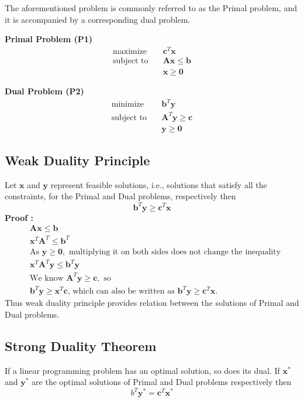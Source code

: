 \documentclass[twoside]{article}
\begin{document}
The aforementioned problem is commonly referred to as the Primal problem, and it is accompanied by a corresponding dual problem.\\

\begin{minipage}[t]{0.45\textwidth}
  \centering
  \textbf{Primal Problem (P1)}
  \begin{align*}
    \text{maximize} \quad & \mathbf{c}^T \mathbf{x} \\
    \text{subject to} \quad & \mathbf{Ax} \leq \mathbf{b} \\
    & \mathbf{x} \geq \mathbf{0}
  \end{align*}
\end{minipage}
\hfill
\begin{minipage}[t]{0.45\textwidth}
  \centering
  \textbf{Dual Problem (P2)}
  \begin{align*}
    \text{minimize} \quad & \mathbf{b}^T \mathbf{y} \\
    \text{subject to} \quad & \mathbf{A}^T \mathbf{y} \geq \mathbf{c} \\
    & \mathbf{y} \geq \mathbf{0}
  \end{align*}
\end{minipage}

\subsection{Weak Duality Principle}

Let $\mathbf{x}$ and $\mathbf{y}$ represent feasible solutions, i.e., solutions that satisfy all the constraints, for the Primal and Dual problems, respectively then
$$\mathbf{b}^T \mathbf{y} \geq \mathbf{c}^T \mathbf{x}$$
\textbf{Proof :}
\[
\begin{aligned}
    & \mathbf{Ax} \leq \mathbf{b} \\
    & \mathbf{x}^T \mathbf{A}^T \leq \mathbf{b}^T \\
    & \text{As } \mathbf{y} \geq \mathbf{0}, \text{ multiplying it on both sides does not change the inequality} \\
    & \mathbf{x}^T \mathbf{A}^T \mathbf{y} \leq \mathbf{b}^T \mathbf{y} \\
    & \text{We know } \mathbf{A}^T \mathbf{y} \geq \mathbf{c}, \text{ so} \\
    & \mathbf{b}^T \mathbf{y} \geq \mathbf{x}^T \mathbf{c} \text{, which can also be written as } \mathbf{b}^T \mathbf{y} \geq \mathbf{c}^T \mathbf{x}.
\end{aligned}
\]
Thus weak duality principle provides relation between the solutions of Primal and Dual problems.

\subsection{Strong Duality Theorem}
If a linear programming problem
has an optimal solution, so does its dual. If $\mathbf{x^*}$ and $\mathbf{y^*}$ are the optimal solutions of Primal and Dual problems respectively then $$b^T \mathbf{y}^* = \mathbf{c}^T \mathbf{x}^*$$
\end{document}
